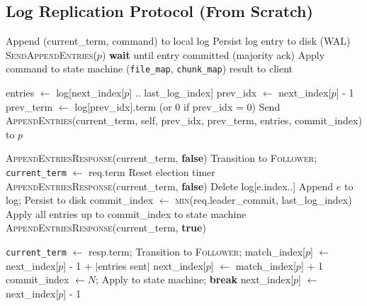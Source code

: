 \documentclass[12pt,a4paper]{article}
\begin{document}
\subsection{Log Replication Protocol (From Scratch)}

\begin{algorithm}
\caption{Raft Log Replication}
\begin{algorithmic}[1]
 
  \State Append (current\_term, command) to local log
  \State Persist log entry to disk (WAL)
    \State \textsc{SendAppendEntries}($p$)
  \EndFor
  \State \textbf{wait} until entry committed (majority ack)
  \State Apply command to state machine (\texttt{file\_map}, \texttt{chunk\_map})
  \State \Return result to client
\EndProcedure

  \State entries $\leftarrow$ log[next\_index[$p$] .. last\_log\_index]
  \State prev\_idx $\leftarrow$ next\_index[$p$] - 1
  \State prev\_term $\leftarrow$ log[prev\_idx].term (or 0 if prev\_idx = 0)
  \State Send \textsc{AppendEntries}(current\_term, self, prev\_idx, prev\_term, entries, commit\_index) to $p$
\EndProcedure

    \State \Return \textsc{AppendEntriesResponse}(current\_term, \textbf{false})
  \EndIf
    \State Transition to \textsc{Follower}; \texttt{current\_term} $\leftarrow$ req.term
    \State Reset election timer
  \EndIf
    \State \Return \textsc{AppendEntriesResponse}(current\_term, \textbf{false})
  \EndIf
      \State Delete log[e.index..] 
    \EndIf
      \State Append $e$ to log; Persist to disk
    \EndIf
  \EndFor
    \State commit\_index $\leftarrow$ \textsc{min}(req.leader\_commit, last\_log\_index)
    \State Apply all entries up to commit\_index to state machine
  \EndIf
  \State \Return \textsc{AppendEntriesResponse}(current\_term, \textbf{true})
\EndProcedure

    \State \texttt{current\_term} $\leftarrow$ resp.term; Transition to \textsc{Follower}; \Return
  \EndIf
    \State match\_index[$p$] $\leftarrow$ next\_index[$p$] - 1 + $|$entries sent$|$
    \State next\_index[$p$] $\leftarrow$ match\_index[$p$] + 1
    \State {}
        \State commit\_index $\leftarrow N$; Apply to state machine; \textbf{break}
      \EndIf
    \EndFor
  \Else
    \State next\_index[$p$] $\leftarrow$ next\_index[$p$] - 1 
  \EndIf
\EndProcedure
\end{algorithmic}
\end{algorithm}
\end{document}
